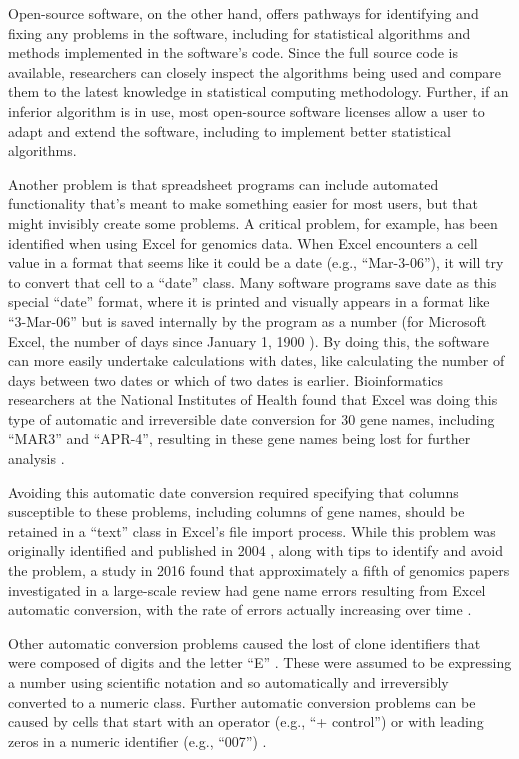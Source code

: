 \documentclass[]{tufte-book}
\begin{document}
Open-source software, on the other hand, offers pathways for identifying and fixing
any problems in the software, including for statistical algorithms and methods
implemented in the software's code. Since the full source code is available, researchers
can closely inspect the algorithms being used and compare them to the latest
knowledge in statistical computing methodology. Further, if an inferior algorithm is in
use, most open-source software licenses allow a user to adapt and extend the software,
including to implement better statistical algorithms.

Another problem is that spreadsheet programs can include automated functionality
that's meant to make something easier for most users, but that might invisibly
create some problems. A critical problem, for example, has been identified when
using Excel for genomics data. When Excel encounters a cell value in a format
that seems like it could be a date (e.g., ``Mar-3-06''), it will try to convert
that cell to a ``date'' class. Many software programs save date as this special
``date'' format, where it is printed and visually appears in a format like
``3-Mar-06'' but is saved internally by the program as a number (for Microsoft
Excel, the number of days since January 1, 1900 \citep{willekens2013chronological}).
By doing this, the software can more easily undertake calculations with dates,
like calculating the number of days between two dates or which of two dates is
earlier. Bioinformatics researchers at the National Institutes of Health found
that Excel was doing this type of automatic and irreversible date conversion for
30 gene names, including ``MAR3'' and ``APR-4'', resulting in these gene names being
lost for further analysis \citep{zeeberg2004mistaken}.

Avoiding this automatic date conversion required specifying that columns
susceptible to these problems, including columns of gene names, should
be retained in a ``text'' class in Excel's file import process. While this
problem was originally identified and published in 2004 \citep{zeeberg2004mistaken},
along with tips to identify and avoid the problem, a study in 2016 found that
approximately a fifth of genomics papers investigated in a large-scale review
had gene name errors resulting from Excel automatic conversion, with the rate of
errors actually increasing over time \citep{ziemann2016gene}.

Other automatic conversion problems caused the lost of clone identifiers that
were composed of digits and the letter ``E'' \citep{zeeberg2004mistaken, welsh2017escape}. These were assumed to be expressing a number using scientific
notation and so automatically and irreversibly converted to a numeric class.
Further automatic conversion problems can be caused by cells that start with an
operator (e.g., ``+ control'') or with leading zeros in a numeric identifier
(e.g., ``007'') \citep{welsh2017escape}.
\end{document}
